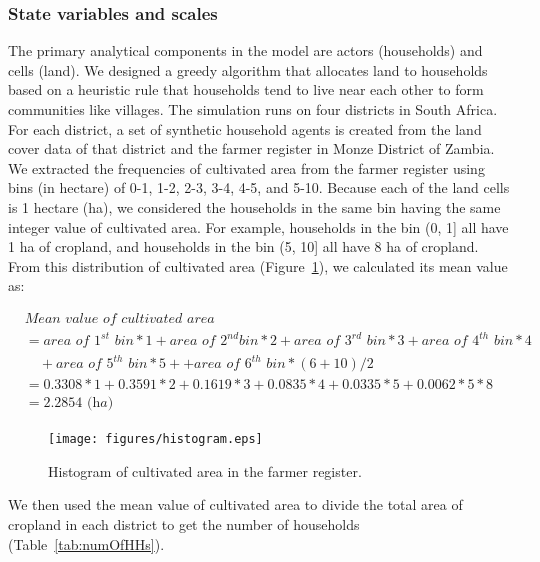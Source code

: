 \documentclass[11pt, titlepage]{article}
\begin{document}
\subsubsection{State variables and scales} 
The primary analytical components in the model are actors (households) and cells (land). We designed a greedy algorithm that allocates land to households based on a heuristic rule that households tend to live near each other to form communities like villages. The simulation runs on four districts in South Africa. For each district, a set of synthetic household agents is created from the land cover data of that district and the farmer register in Monze District of Zambia. We extracted the frequencies of cultivated area from the farmer register using bins (in hectare) of 0-1, 1-2, 2-3, 3-4, 4-5, and 5-10. Because each of the land cells is 1 hectare (ha), we considered the households in the same bin having the same integer value of cultivated area. For example, households in the bin (0, 1] all have 1 ha of cropland, and households in the bin (5, 10] all have 8 ha of cropland. From this distribution of cultivated area (Figure~\ref{fig:histo}), we calculated its mean value as:

\begin{displaymath} 
\begin{split} & \textit{Mean value of cultivated area} \\ 
& = \textit{area of 1}^{st}\textit{ bin} * 1 + \textit{area of 2}^{nd}\textit{bin} * 2 + \textit{area of 3}^{rd}\textit{ bin} * 3 + \textit{area of 4}^{th}\textit{ bin} * 4 \\ 
& \quad  + \textit{area of 5}^{th}\textit{ bin} * 5 + + \textit{area of 6}^{th}\textit{ bin} * (6 + 10)/2 \\ & = 0.3308 *1 + 0.3591 * 2 + 0.1619 * 3 + 0.0835 * 4 + 0.0335 * 5 + 0.0062 * 5 * 8 \\ 
& = 2.2854 \textit{ (ha)} 
\end{split}
\end{displaymath}

\begin{figure}[!ht] 
\centering 
\texttt{[image: figures/histogram.eps]} 
\caption{Histogram of cultivated area in
the farmer register. } 
\label{fig:histo} 
\end{figure}

We then used the mean value of cultivated area to divide the total area of cropland in each district to get the number of households (Table~\ref{tab:numOfHHs}).
\end{document}
